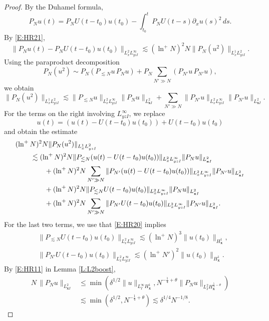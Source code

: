 \documentclass[12pt,letterpaper]{amsart}
\newcommand{\indentalign}{\hspace{0.3in}&\hspace{-0.3in}}
\theoremstyle{remark}
\numberwithin{equation}{section}
\numberwithin{theorem}{section}
\numberwithin{table}{section}
\begin{document}
\begin{proof}
By the Duhamel formula,
$$
P_N u(t) = P_NU(t-t_0) u(t_0) - \int_{t_0}^t P_N U(t-s) \partial_x u(s)^2 \, ds.
$$
By \eqref{E:HR21},
\begin{equation}
\label{E:HR22}
\|P_N u(t) - P_NU(t-t_0) u(t_0) \|_{L_x^2 L_{yz I}^\infty} \lesssim (\ln^+ N)^2 N \| P_N( u^2) \|_{L_x^1L_{yzI}^2}.
\end{equation}
Using the paraproduct decomposition
$$
P_N ( u^2) \sim P_N (P_{\lesssim N} u \, P_N u) + P_N \sum_{N'\gg N} (P_{N'}u \, P_{N'}u),
$$
we obtain
$$
\| P_N (u^2) \|_{L_x^1 L_{yzI}^2} \lesssim \| P_{\lesssim N} u \|_{L_x^2L_{yzI}^\infty} \|P_N u \|_{L_{\mathbf{x}I}^2} + \sum_{N'\gg N} \| P_{N'} u \|_{L_x^2L_{yzI}^\infty} \|P_{N'} u \|_{L_{\mathbf{x}I}^2}.
$$
For the terms on the right involving  $L_{yzI}^\infty$, we replace
$$
u(t)= (u(t) - U(t-t_0)u(t_0))+U(t-t_0)u(t_0)
$$
and obtain the estimate
\begin{equation}
\label{E:HR23}
\begin{aligned}
\indentalign (\ln^+ N)^2 N \| P_N (u^2) \|_{L_x^1 L_{yzI}^2} \\
&\lesssim   (\ln^+ N)^2 N\|P_{\lesssim N} (u(t)-U(t-t_0)u(t_0)) \|_{L_x^2 L_{yz I}^\infty} \|P_N u \|_{L_{\mathbf{x}I}^2} \\
&\qquad + (\ln^+ N)^2 N\sum_{N' \gg N} \|P_{N'}(u(t)-U(t-t_0)u(t_0)) \|_{L_x^2 L_{yz I}^\infty}  \|P_{N'} u \|_{L_{\mathbf{x}I}^2}\\
&\qquad +  (\ln^+ N)^2 N\|P_{\lesssim N} U(t-t_0)u(t_0) \|_{L_x^2 L_{yz I}^\infty} \|P_N u \|_{L_{\mathbf{x}I}^2} \\
&\qquad + (\ln^+ N)^2 N\sum_{N' \gg N} \|P_{N'}U(t-t_0)u(t_0) \|_{L_x^2 L_{yz I}^\infty}  \|P_{N'} u \|_{L_{\mathbf{x}I}^2}.
\end{aligned}
\end{equation}
For the last two terms, we use that \eqref{E:HR20} implies
\begin{equation}
\label{E:HR24}
\begin{aligned}
&\|P_{\lesssim N} U(t-t_0)u(t_0) \|_{L_x^2 L_{yz I}^\infty} \lesssim (\ln^+ N)^3 \|u(t_0)\|_{H_{\mathbf{x}}^1}, \\
& \|P_{N'}U(t-t_0)u(t_0) \|_{L_x^2 L_{yz I}^\infty}\lesssim (\ln^+ N')^2 \|u(t_0)\|_{H_{\mathbf{x}}^1}.
\end{aligned}
\end{equation}
By \eqref{E:HR11} in Lemma \ref{L:L2boost}, 
\begin{equation}
\label{E:HR25}
\begin{aligned}
N \, \|P_N u \|_{L_{\mathbf{x}I}^2} &\leq \min\left( \delta^{1/2} \|u\|_{L_I^\infty H_{\mathbf{x}}^1}, N^{-\frac14+\theta} \|P_N u \|_{L_I^2H_{\mathbf{x}}^{\frac54-\theta}} \right) \\
&\lesssim \min(\delta^{1/2}, N^{-\frac14+\theta}) \lesssim \delta^{1/4} N^{-1/8}.
\end{aligned}
\end{equation}
 

\end{proof}
\end{document}
